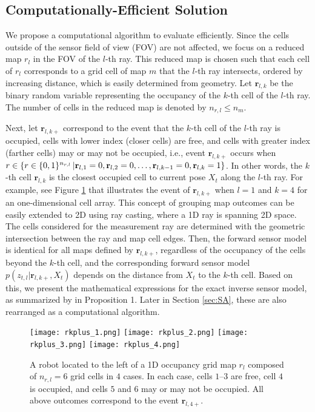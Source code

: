 \subsection{Computationally-Efficient Solution}

We propose a computational algorithm to evaluate  efficiently. 
Since the cells outside of the sensor field of view (FOV) are not affected, we focus on a reduced map $r_l$ in the FOV of the $l$-th ray. This reduced map is chosen such that each cell of $r_l$ corresponds to a grid cell of map $m$ that the $l$-th ray intersects, ordered by increasing distance, which is easily determined from geometry. Let $\mathbf{r}_{l,k}$ be the binary random variable representing the occupancy of the $k$-th cell of the $l$-th ray. The number of cells in the reduced map is denoted by $n_{r,l}\leq n_m$.

Next, let $\mathbf{r}_{l,k+}$ correspond to the event that the $k$-th cell of the $l$-th ray is occupied, cells with lower index (closer cells) are free, and cells with greater index (farther cells) may or may not be occupied, i.e., event $\mathbf{r}_{l,k+}$ occurs when \\$r\in\left\{ r\in\{0,1\}^{{n_{r,l}}}\,|\mathbf{r}_{l,1}=0,\mathbf{r}_{l,2}=0,\ldots,\mathbf{r}_{l,k-1}=0,\mathbf{r}_{l,k}=1 \right\}$. In other words, the $k$-th cell $\mathbf{r}_{l,k}$ is the closest occupied cell to current pose $X_t$ along the $l$-th ray. For example, see Figure \ref{fig:show_rkplus} that illustrates the event of $\mathbf{r}_{l,k+}$ when $l=1$ and $k=4$ for an one-dimensional cell array. This concept of grouping map outcomes can be easily extended to 2D using ray casting, where a 1D ray is spanning 2D space. The cells considered for the measurement ray are determined with the geometric intersection between the ray and map cell edges.
Then, the forward sensor model is identical for all maps defined by $\mathbf{r}_{l,k+}$, regardless of the occupancy of the cells beyond the $k$-th cell, and the corresponding forward sensor model $p(z_{t,l}|\mathbf{r}_{l,k+},X_{t})$ depends on the distance from $X_t$ to the $k$-th cell. Based on this, we present the mathematical expressions for the exact inverse sensor model, as summarized by  in Proposition 1. Later in Section \ref{sec:SA}, these are also rearranged as a computational algorithm. 



\begin{figure}
  \centering
  \texttt{[image: rkplus\_1.png]}
    \centering
  \texttt{[image: rkplus\_2.png]}  
  \centering
  \texttt{[image: rkplus\_3.png]}
    \centering
  \texttt{[image: rkplus\_4.png]}
  \caption{A robot located to the left of a 1D occupancy grid map $r_l$ composed of $n_{r,l}=6$ grid cells in $4$ cases. In each case, cells $1$--$3$ are free, cell $4$ is occupied, and cells $5$ and $6$ may or may not be occupied. All above outcomes correspond to the event $\mathbf{r}_{l,4+}$.}
  \label{fig:show_rkplus}
\end{figure}

